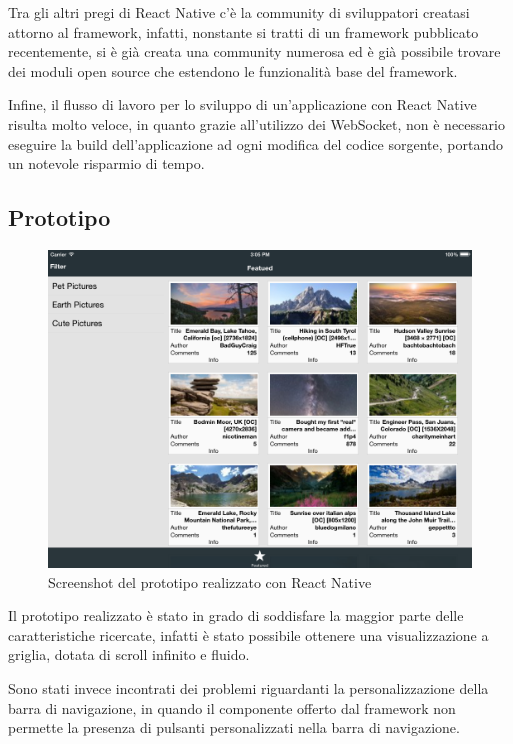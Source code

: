 Tra gli altri pregi di React Native c'è la community di sviluppatori creatasi attorno al framework, infatti, nonstante si tratti di un framework pubblicato recentemente, si è già creata una community numerosa ed è già possibile trovare dei moduli open source che estendono le funzionalità base del framework.

Infine, il flusso di lavoro per lo sviluppo di un'applicazione con React Native risulta molto veloce, in quanto grazie all'utilizzo dei WebSocket, non è necessario eseguire la build dell'applicazione ad ogni modifica del codice sorgente, portando un notevole risparmio di tempo.

\subsection{Prototipo}

\begin{figure}[htp]
\centering
\includegraphics[width=\textwidth]{../immagini/prototipo-react-native}
\caption{Screenshot del prototipo realizzato con React Native}  
\end{figure}

Il prototipo realizzato è stato in grado di soddisfare la maggior parte delle caratteristiche ricercate, infatti è stato possibile ottenere una visualizzazione a griglia, dotata di scroll infinito e fluido.

Sono stati invece incontrati dei problemi riguardanti la personalizzazione della barra di navigazione, in quando il componente offerto dal framework non permette la presenza di pulsanti personalizzati nella barra di navigazione.

